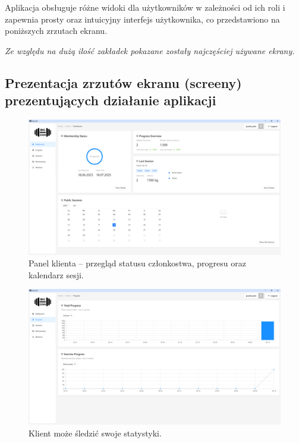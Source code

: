 \documentclass[../../spr.tex]{subfiles}
\begin{document}
Aplikacja obsługuje różne widoki dla użytkowników w zależności od ich roli i zapewnia prosty oraz intuicyjny interfejs użytkownika, co przedstawiono na poniższych zrzutach ekranu.

\vspace{8pt}

\noindent\textit{Ze względu na dużą ilość zakładek pokazane zostały najczęściej używane ekrany.}

\subsection{Prezentacja zrzutów ekranu (screeny) prezentujących działanie aplikacji}

\begin{figure}[H]
  \centering
  \includegraphics[width=\textwidth]{img/client.png}
  \caption{Panel klienta – przegląd statusu członkostwa, progresu oraz kalendarz sesji.}
\end{figure}

\begin{figure}[H]
  \centering
  \includegraphics[width=\textwidth]{img/client_progress.png}
  \caption{Klient może śledzić swoje statystyki.}
\end{figure}
\end{document}
